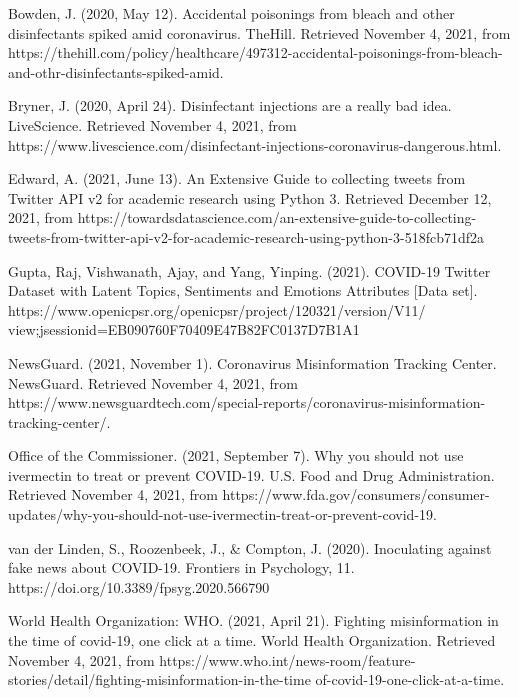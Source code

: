 \documentclass[fontsize=11pt]{article}
\begin{document}
    \begin{doublespace}
        \begin{hangparas}{0.25in}{1}
            Bowden, J. (2020, May 12). Accidental poisonings from bleach and other disinfectants spiked amid coronavirus. TheHill. Retrieved November 4, 2021, from https://thehill.com/policy/healthcare/497312-accidental-poisonings-from-bleach-and-othr-disinfectants-spiked-amid.

            Bryner, J. (2020, April 24). Disinfectant injections are a really bad idea. LiveScience. Retrieved November 4, 2021, from https://www.livescience.com/disinfectant-injections-coronavirus-dangerous.html.

            Edward, A. (2021, June 13). An Extensive Guide to collecting tweets from Twitter API v2 for academic research using Python 3. Retrieved December 12, 2021, from https://towardsdatascience.com/an-extensive-guide-to-collecting-tweets-from-twitter-api-v2-for-academic-research-using-python-3-518fcb71df2a

            Gupta, Raj, Vishwanath, Ajay, and Yang, Yinping. (2021). COVID-19 Twitter Dataset with Latent Topics, Sentiments and Emotions Attributes [Data set]. https://www.openicpsr.org/openicpsr/project/120321/version/V11/\\view;jsessionid=EB090760F70409E47B82FC0137D7B1A1

            NewsGuard. (2021, November 1). Coronavirus Misinformation Tracking Center. NewsGuard. Retrieved November 4, 2021, from https://www.newsguardtech.com/special-reports/coronavirus-misinformation-tracking-center/.

            Office of the Commissioner. (2021, September 7). Why you should not use ivermectin to treat or prevent COVID-19. U.S. Food and Drug Administration. Retrieved November 4, 2021, from https://www.fda.gov/consumers/consumer-updates/why-you-should-not-use-ivermectin-treat-or-prevent-covid-19.

            van der Linden, S., Roozenbeek, J., \& Compton, J. (2020). Inoculating against fake news about COVID-19. Frontiers in Psychology, 11. https://doi.org/10.3389/fpsyg.2020.566790

            World Health Organization: WHO. (2021, April 21). Fighting misinformation in the time of covid-19, one click at a time. World Health Organization. Retrieved November 4, 2021, from https://www.who.int/news-room/feature-stories/detail/fighting-misinformation-in-the-time of-covid-19-one-click-at-a-time.

        \end{hangparas}
    \end{doublespace}
\end{document}
